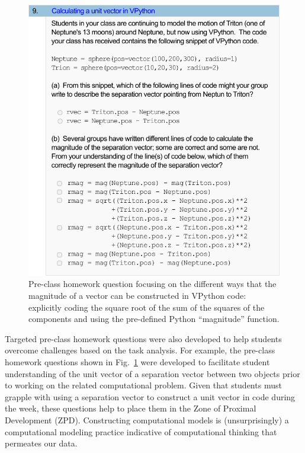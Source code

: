 \documentclass{msuphddissertation}
\begin{document}
\begin{doublespace}
\begin{figure}[ht]\centering
\includegraphics[scale=0.75]{images/CH3PreClassQuestion.pdf}
\caption{Pre-class homework question focusing on the different ways that the magnitude of a vector can be constructed in VPython code: explicitly coding the square root of the sum of the squares of the components and using the pre-defined Python ``magnitude'' function.}\label{CH3:PreClassQuestion}
\end{figure} 

Targeted pre-class homework questions were also developed to help students overcome challenges based on the task analysis.  For example, the pre-class homework questions shown in Fig.~\ref{CH3:PreClassQuestion} were developed to facilitate student understanding of the unit vector of a separation vector between two objects prior to working on the related computational problem.  Given that students must grapple with using a separation vector to construct a unit vector in code during the week, these questions help to place them in the Zone of Proximal Development (ZPD)\cite{Vygotsky1980}.  Constructing computational models is (unsurprisingly) a computational modeling practice indicative of computational thinking that permeates our data.


\end{doublespace}
\end{document}

